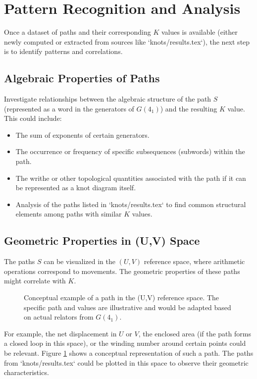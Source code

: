 \documentclass{article}
\begin{document}
\section{Pattern Recognition and Analysis}
Once a dataset of paths and their corresponding $K$ values is available (either newly computed or extracted from sources like `knots/results.tex`), the next step is to identify patterns and correlations.

\subsection{Algebraic Properties of Paths}
Investigate relationships between the algebraic structure of the path $S$ (represented as a word in the generators of $G(4_1)$) and the resulting $K$ value. This could include:
\begin{itemize}
    \item The sum of exponents of certain generators.
    \item The occurrence or frequency of specific subsequences (subwords) within the path.
    \item The writhe or other topological quantities associated with the path if it can be represented as a knot diagram itself.
    \item Analysis of the paths listed in `knots/results.tex` to find common structural elements among paths with similar $K$ values.
\end{itemize}

\subsection{Geometric Properties in (U,V) Space}
The paths $S$ can be visualized in the $(U,V)$ reference space, where arithmetic operations correspond to movements. The geometric properties of these paths might correlate with $K$.

\begin{figure}[h!]
    \centering
    \resizebox{0.8\textwidth}{!}{}
    \caption{Conceptual example of a path in the (U,V) reference space. The specific path and values are illustrative and would be adapted based on actual relators from $G(4_1)$.}
    \label{fig:uv_path}
\end{figure}

For example, the net displacement in $U$ or $V$, the enclosed area (if the path forms a closed loop in this space), or the winding number around certain points could be relevant. Figure \ref{fig:uv_path} shows a conceptual representation of such a path. The paths from `knots/results.tex` could be plotted in this space to observe their geometric characteristics.
\end{document}
